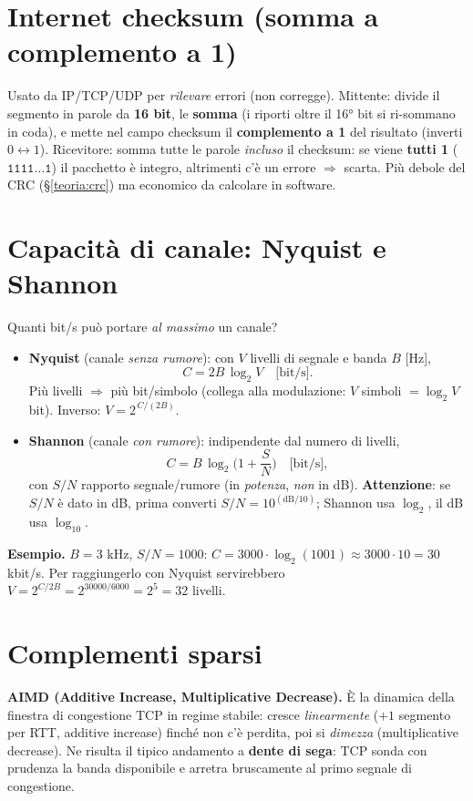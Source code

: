 \documentclass[11pt,a4paper]{report}
\begin{document}
\section{Internet checksum (somma a complemento a 1)}
\label{th:checksum}
Usato da IP/TCP/UDP per \emph{rilevare} errori (non corregge). Mittente: divide il
segmento in parole da \textbf{16 bit}, le \textbf{somma} (i riporti oltre il 16°
bit si ri-sommano in coda), e mette nel campo checksum il \textbf{complemento a 1}
del risultato (inverti $0\leftrightarrow1$). Ricevitore: somma tutte le parole
\emph{incluso} il checksum: se viene \textbf{tutti 1} ($\mathtt{1111\dots1}$) il
pacchetto è integro, altrimenti c'è un errore $\Rightarrow$ scarta. Più debole del
CRC (\S\ref{teoria:crc}) ma economico da calcolare in software.

\section{Capacità di canale: Nyquist e Shannon}
\label{th:capacita}
Quanti bit/s può portare \emph{al massimo} un canale?
\begin{itemize}[noitemsep]
\item \textbf{Nyquist} (canale \emph{senza rumore}): con $V$ livelli di segnale e
banda $B$ [Hz],
\[ C = 2B\,\log_2 V \quad\text{[bit/s]}. \]
Più livelli $\Rightarrow$ più bit/simbolo (collega alla modulazione: $V$ simboli
$=\log_2 V$ bit). Inverso: $V=2^{\,C/(2B)}$.
\item \textbf{Shannon} (canale \emph{con rumore}): indipendente dal numero di
livelli,
\[ C = B\,\log_2\!\Big(1+\frac{S}{N}\Big) \quad\text{[bit/s]}, \]
con $S/N$ rapporto segnale/rumore (in \emph{potenza}, \emph{non} in dB).
\textbf{Attenzione}: se $S/N$ è dato in dB, prima converti
$S/N = 10^{(\text{dB}/10)}$; Shannon usa $\log_2$, il dB usa $\log_{10}$.
\end{itemize}
\textbf{Esempio.} $B=3$ kHz, $S/N=1000$: $C=3000\cdot\log_2(1001)\approx
3000\cdot 10 = 30$ kbit/s. Per raggiungerlo con Nyquist servirebbero
$V=2^{C/2B}=2^{30000/6000}=2^5=32$ livelli.

\section{Complementi sparsi}
\textbf{AIMD (Additive Increase, Multiplicative Decrease).} È la dinamica della
finestra di congestione TCP in regime stabile: cresce \emph{linearmente} ($+1$
segmento per RTT, additive increase) finché non c'è perdita, poi si
\emph{dimezza} (multiplicative decrease). Ne risulta il tipico andamento a
\textbf{dente di sega}: TCP sonda con prudenza la banda disponibile e arretra
bruscamente al primo segnale di congestione.
\end{document}
